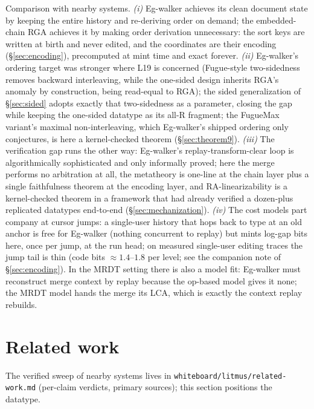 \documentclass[11pt]{article}
\newcommand{\code}[1]{\texttt{#1}}
\begin{document}
\noindent Comparison with nearby systems. \emph{(i)} Eg-walker
achieves its clean document state by keeping the entire history and
re-deriving order on demand; the embedded-chain RGA achieves it by
making order derivation unnecessary: the sort keys are written at
birth and never edited, and the coordinates are their encoding
(\S\ref{sec:encoding}), precomputed at mint time and exact forever.
\emph{(ii)} Eg-walker's ordering target was stronger where L19 is
concerned (Fugue-style two-sidedness removes backward interleaving,
while the one-sided design inherits RGA's anomaly by construction,
being read-equal to RGA); the sided generalization of
\S\ref{sec:sided} adopts exactly that two-sidedness as a parameter,
closing the gap while keeping the one-sided datatype as its all-R
fragment; the FugueMax variant's maximal non-interleaving, which
Eg-walker's shipped ordering only conjectures, is here a kernel-checked
theorem (\S\ref{sec:theorem9}). \emph{(iii)} The verification gap runs
the other way: Eg-walker's replay-transform-clear loop is
algorithmically sophisticated and only informally proved; here the
merge performs no arbitration at all, the metatheory is one-line at
the chain layer plus a single faithfulness theorem at the encoding
layer, and RA-linearizability is a kernel-checked theorem in a
framework that had already verified a dozen-plus replicated
datatypes end-to-end (\S\ref{sec:mechanization}). \emph{(iv)} The
cost models part company at cursor jumps: a single-user history that
hops back to type at an old anchor is free for Eg-walker (nothing
concurrent to replay) but mints log-gap bits here, once per jump, at
the run head; on measured single-user editing traces the jump tail
is thin (code bits $\approx 1.4$--$1.8$ per level; see the companion
note of \S\ref{sec:encoding}). In the MRDT setting there is also a model
fit: Eg-walker must reconstruct merge context by replay because the
op-based model gives it none; the MRDT model hands the merge its LCA,
which is exactly the context replay rebuilds.

\section{Related work}
\label{sec:related}

The verified sweep of nearby systems lives in
\code{whiteboard/litmus/related-work.md} (per-claim verdicts, primary
sources); this section positions the datatype.
\end{document}

